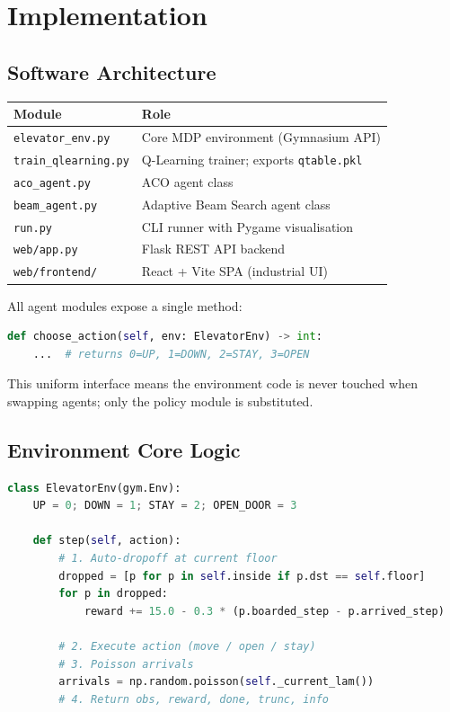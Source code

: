 \documentclass[12pt,a4paper]{article}
\begin{document}
\section{Implementation}

\subsection{Software Architecture}

\begin{center}
\begin{tabular}{ll}
\toprule
\textbf{Module}          & \textbf{Role} \\
\midrule
\texttt{elevator\_env.py}   & Core MDP environment (Gymnasium API) \\
\texttt{train\_qlearning.py}& Q-Learning trainer; exports \texttt{qtable.pkl} \\
\texttt{aco\_agent.py}      & ACO agent class \\
\texttt{beam\_agent.py}     & Adaptive Beam Search agent class \\
\texttt{run.py}             & CLI runner with Pygame visualisation \\
\texttt{web/app.py}         & Flask REST API backend \\
\texttt{web/frontend/}      & React + Vite SPA (industrial UI) \\
\bottomrule
\end{tabular}
\end{center}

All agent modules expose a single method:
\begin{lstlisting}[language=Python]
def choose_action(self, env: ElevatorEnv) -> int:
    ...  # returns 0=UP, 1=DOWN, 2=STAY, 3=OPEN
\end{lstlisting}

This uniform interface means the environment code is never touched when swapping
agents; only the policy module is substituted.

\subsection{Environment Core Logic}

\begin{lstlisting}[language=Python]
class ElevatorEnv(gym.Env):
    UP = 0; DOWN = 1; STAY = 2; OPEN_DOOR = 3

    def step(self, action):
        # 1. Auto-dropoff at current floor
        dropped = [p for p in self.inside if p.dst == self.floor]
        for p in dropped:
            reward += 15.0 - 0.3 * (p.boarded_step - p.arrived_step)

        # 2. Execute action (move / open / stay)
        # 3. Poisson arrivals
        arrivals = np.random.poisson(self._current_lam())
        # 4. Return obs, reward, done, trunc, info
\end{lstlisting}
\end{document}
